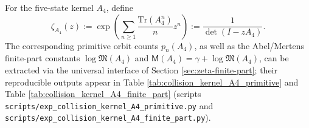 



\begin{definition}\label{def:pom-collision-zeta-a4}
For the five-state kernel \(A_4\), define
$$
\zeta_{A_4}(z):=\exp\!\left(\sum_{n\ge 1}\frac{\mathrm{Tr}(A_4^n)}{n}z^n\right)
:=\frac{1}{\det(I-zA_4)}.
$$
The corresponding primitive orbit counts \(p_n(A_4)\), as well as the Abel/Mertens finite-part constants \(\log\mathfrak{M}(A_4)\) and \(\mathsf{M}(A_4)=\gamma+\log\mathfrak{M}(A_4)\), can be extracted via the universal interface of Section \ref{sec:zeta-finite-part}; their reproducible outputs appear in Table \ref{tab:collision_kernel_A4_primitive} and Table \ref{tab:collision_kernel_A4_finite_part} (scripts \texttt{scripts/exp\_collision\_kernel\_A4\_primitive.py} and \texttt{scripts/exp\_collision\_kernel\_A4\_finite\_part.py}).
\end{definition}




